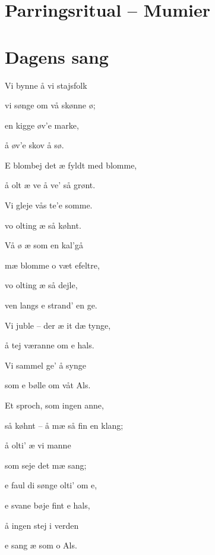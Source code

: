 \begin{minipage}[t]{100mm}
\vspace{3mm}

\section*{Parringsritual -- Mumier}


\section*{Dagens sang}
\begin{center}
Vi bynne å vi stajsfolk

vi sønge om vå skønne ø;

en kigge øv’e marke,

å øv’e skov å sø.

E blombej det æ fyldt med blomme,

å olt æ ve å ve’ så grønt.

Vi gleje vås te’e somme.

vo olting æ så køhnt.

Vå ø æ som en kal’gå

mæ blomme o væt efeltre,

vo olting æ så dejle,

ven langs e strand’ en ge.

Vi juble – der æ it dæ tynge,

å tej væranne om e hals.

Vi sammel ge’ å synge

som e bølle om våt Als.

Et sproch, som ingen anne,

så køhnt – å mæ så fin en klang;

å olti’ æ vi manne

som seje det mæ sang;

e faul di sønge olti’ om e,

e svane bøje fint e hals,

å ingen stej i verden

e sang æ som o Als.
\end{center}


\end{minipage}
